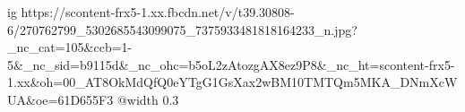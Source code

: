  
 
 
 
 

\ifcmt
  ig https://scontent-frx5-1.xx.fbcdn.net/v/t39.30808-6/270762799_5302685543099075_7375933481818164233_n.jpg?_nc_cat=105&ccb=1-5&_nc_sid=b9115d&_nc_ohc=b5oL2zAtozgAX8ez9P8&_nc_ht=scontent-frx5-1.xx&oh=00_AT8OkMdQfQ0eYTgG1GsXax2wBM10TMTQm5MKA_DNmXcWUA&oe=61D655F3
  @width 0.3
\fi
